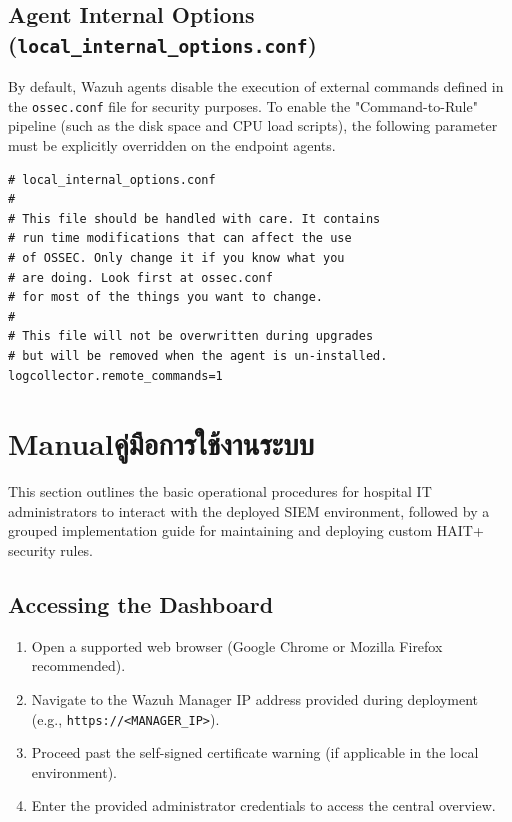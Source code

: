 \section{Agent Internal Options (\texttt{local\_internal\_options.conf})}
By default, Wazuh agents disable the execution of external commands defined in the \texttt{ossec.conf} file for security purposes. To enable the "Command-to-Rule" pipeline (such as the disk space and CPU load scripts), the following parameter must be explicitly overridden on the endpoint agents.

\begin{verbatim}
# local_internal_options.conf
#
# This file should be handled with care. It contains
# run time modifications that can affect the use
# of OSSEC. Only change it if you know what you
# are doing. Look first at ossec.conf
# for most of the things you want to change.
#
# This file will not be overwritten during upgrades
# but will be removed when the agent is un-installed.
logcollector.remote_commands=1
\end{verbatim}

\chapter{\ifenglish Manual\else คู่มือการใช้งานระบบ\fi}
\label{app:manual}

This section outlines the basic operational procedures for hospital IT administrators to interact with the deployed SIEM environment, followed by a grouped implementation guide for maintaining and deploying custom HAIT+ security rules.


\section{Accessing the Dashboard}
\begin{enumerate}
    \item Open a supported web browser (Google Chrome or Mozilla Firefox recommended).
    \item Navigate to the Wazuh Manager IP address provided during deployment (e.g., \texttt{https://<MANAGER\_IP>}).
    \item Proceed past the self-signed certificate warning (if applicable in the local environment).
    \item Enter the provided administrator credentials to access the central overview.
\end{enumerate}

